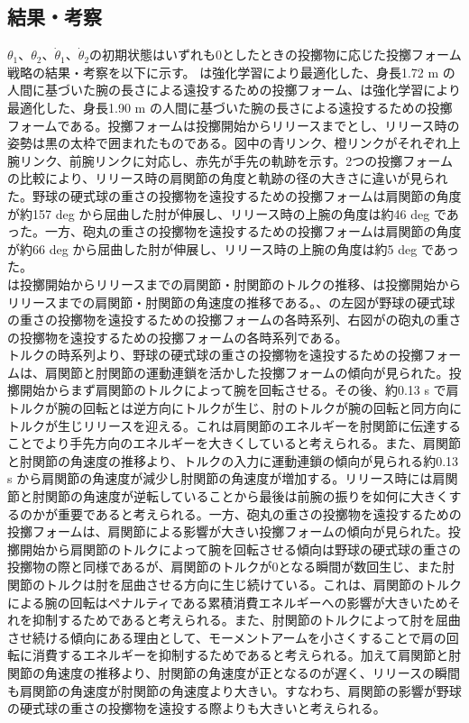 \subsection{結果・考察}
$\theta_{1}$、$\theta_{2}$、$\dot{\theta}_{1}$、$\dot{\theta}_{2}$の初期状態はいずれも0としたときの投擲物に応じた投擲フォーム戦略の結果・考察を以下に示す。
は強化学習により最適化した、身長1.72 m の人間に基づいた腕の長さによる遠投するための投擲フォーム、は強化学習により最適化した、身長1.90 m の人間に基づいた腕の長さによる遠投するための投擲フォームである。投擲フォームは投擲開始からリリースまでとし、リリース時の姿勢は黒の太枠で囲まれたものである。図中の青リンク、橙リンクがそれぞれ上腕リンク、前腕リンクに対応し、赤先が手先の軌跡を示す。2つの投擲フォームの比較により、リリース時の肩関節の角度と軌跡の径の大きさに違いが見られた。野球の硬式球の重さの投擲物を遠投するための投擲フォームは肩関節の角度が約157 deg から屈曲した肘が伸展し、リリース時の上腕の角度は約46 deg であった。一方、砲丸の重さの投擲物を遠投するための投擲フォームは肩関節の角度が約66 deg から屈曲した肘が伸展し、リリース時の上腕の角度は約5 deg であった。\\
は投擲開始からリリースまでの肩関節・肘関節のトルクの推移、は投擲開始からリリースまでの肩関節・肘関節の角速度の推移である。、の左図が野球の硬式球の重さの投擲物を遠投するための投擲フォームの各時系列、右図がの砲丸の重さの投擲物を遠投するための投擲フォームの各時系列である。\\
トルクの時系列より、野球の硬式球の重さの投擲物を遠投するための投擲フォームは、肩関節と肘関節の運動連鎖を活かした投擲フォームの傾向が見られた。投擲開始からまず肩関節のトルクによって腕を回転させる。その後、約0.13 s で肩トルクが腕の回転とは逆方向にトルクが生じ、肘のトルクが腕の回転と同方向にトルクが生じリリースを迎える。これは肩関節のエネルギーを肘関節に伝達することでより手先方向のエネルギーを大きくしていると考えられる。また、肩関節と肘関節の角速度の推移より、トルクの入力に運動連鎖の傾向が見られる約0.13 s から肩関節の角速度が減少し肘関節の角速度が増加する。リリース時には肩関節と肘関節の角速度が逆転していることから最後は前腕の振りを如何に大きくするのかが重要であると考えられる。一方、砲丸の重さの投擲物を遠投するための投擲フォームは、肩関節による影響が大きい投擲フォームの傾向が見られた。投擲開始から肩関節のトルクによって腕を回転させる傾向は野球の硬式球の重さの投擲物の際と同様であるが、肩関節のトルクが0となる瞬間が数回生じ、また肘関節のトルクは肘を屈曲させる方向に生じ続けている。これは、肩関節のトルクによる腕の回転はペナルティである累積消費エネルギーへの影響が大きいためそれを抑制するためであると考えられる。また、肘関節のトルクによって肘を屈曲させ続ける傾向にある理由として、モーメントアームを小さくすることで肩の回転に消費するエネルギーを抑制するためであると考えられる。加えて肩関節と肘関節の角速度の推移より、肘関節の角速度が正となるのが遅く、リリースの瞬間も肩関節の角速度が肘関節の角速度より大きい。すなわち、肩関節の影響が野球の硬式球の重さの投擲物を遠投する際よりも大きいと考えられる。

